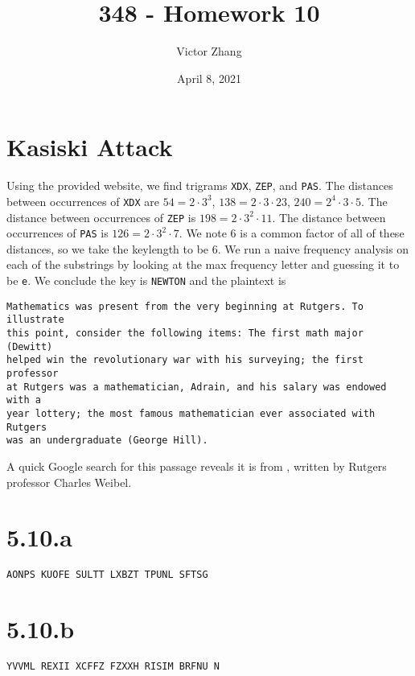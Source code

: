 \documentclass{article}
\title{348 - Homework 10}
\author{Victor Zhang}
\date{April 8, 2021}
\newenvironment{myindentpar}[1]
  {\begin{list}{}
          {\setlength{\leftmargin}{#1}}
          \item[]
  }
  {\end{list}}
\begin{document}
\maketitle

\section*{Kasiski Attack}
Using the provided website, we find trigrams \verb|XDX|, \verb|ZEP|, and \verb|PAS|.
The distances between occurrences of \verb|XDX| are $54 = 2 \cdot 3^3$, $138 = 2 \cdot 3 \cdot 23$, $240 = 2^4 \cdot 3 \cdot 5$. The distance between occurrences of \verb|ZEP| is $198 = 2 \cdot 3^2 \cdot 11$. The distance between occurrences of \verb|PAS| is $126 = 2 \cdot 3^2 \cdot 7$. We note $6$ is a common factor of all of these distances, so we take the keylength to be 6. We run a naive frequency analysis on each of the substrings by looking at the max frequency letter and guessing it to be \verb|e|. We conclude the key is \verb|NEWTON| and the plaintext is
\begin{myindentpar}{2em}
\verb|Mathematics was present from the very beginning at Rutgers. To illustrate|\\
\verb|this point, consider the following items: The first math major (Dewitt)|\\
\verb|helped win the revolutionary war with his surveying; the first professor|\\
\verb|at Rutgers was a mathematician, Adrain, and his salary was endowed with a|\\
\verb|year lottery; the most famous mathematician ever associated with Rutgers|\\
\verb|was an undergraduate (George Hill).|
\end{myindentpar}
A quick Google search for this passage reveals it is from , written by Rutgers professor Charles Weibel.


\section*{5.10.a}
\verb|AONPS KUOFE SULTT LXBZT TPUNL SFTSG|
\section*{5.10.b}
\verb|YVVML REXII XCFFZ FZXXH RISIM BRFNU N|
\end{document}
